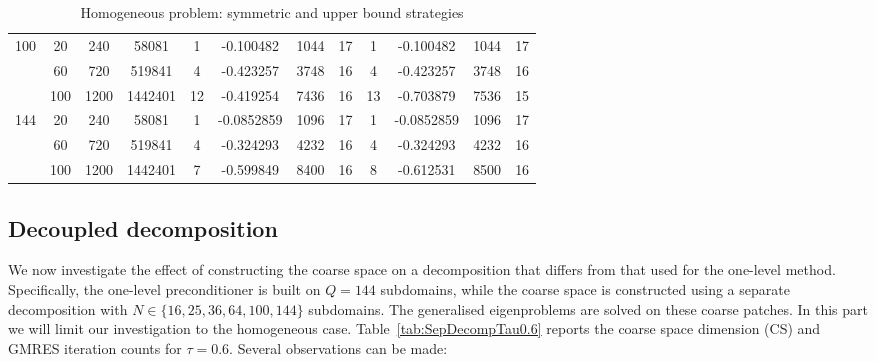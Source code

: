 \documentclass[numbers,webpdf,imaiai]{ima-authoring-template}%
\theoremstyle{thmstyletwo}%
\numberwithin{equation}{section}
\numberwithin{equation}{section}
\begin{document}
{\begin{table}[h!]
\begin{tabular}{cccc|cccc|cccc}
\hline
100 & 20 & 240 & 58081 & 1 & -0.100482 & 1044 & 17 & 1 & -0.100482 & 1044 & 17 \\
 & 60 & 720 & 519841 & 4 & -0.423257 & 3748 & 16 & 4 & -0.423257 & 3748 & 16 \\
 & 100 & 1200 & 1442401 & 12 & -0.419254 & 7436 & 16 & 13 & -0.703879 & 7536 & 15 \\
\hline
144 & 20 & 240 & 58081 & 1 & -0.0852859 & 1096 & 17 & 1 & -0.0852859 & 1096 & 17 \\
 & 60 & 720 & 519841 & 4 & -0.324293 & 4232 & 16 & 4 & -0.324293 & 4232 & 16 \\
 & 100 & 1200 & 1442401 & 7 & -0.599849 & 8400 & 16 & 8 & -0.612531 & 8500 & 16 \\
\hline
\end{tabular}
\caption{Homogeneous problem: symmetric and upper bound strategies}
    \label{tab:+-0.6}
\end{table}



\subsection{Decoupled decomposition}
\label{subsec:Decoupled}


We now investigate the effect of constructing the coarse space on a decomposition that differs from that used for the one-level method. 
Specifically, the one-level preconditioner is built on $Q=144$ subdomains, while the coarse space is constructed 
using a separate decomposition with $N \in \{16,25,36,64,100,144\}$ subdomains. 
The generalised eigenproblems are solved on these coarse patches. 
In this part we will limit our investigation to the homogeneous case.
Table~\ref{tab:SepDecompTau0.6} reports the coarse space dimension (CS) and GMRES iteration counts for $\tau=0.6$. 
Several observations can be made:

}
\end{document}
